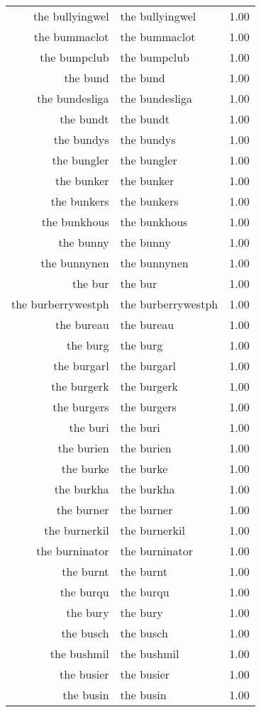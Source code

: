 \begin{table}[ht]
\begin{tabular}{rlr}
  the bullyingwel & the bullyingwel & 1.00 \\ 
  the bummaclot & the bummaclot & 1.00 \\ 
  the bumpclub & the bumpclub & 1.00 \\ 
  the bund & the bund & 1.00 \\ 
  the bundesliga & the bundesliga & 1.00 \\ 
  the bundt & the bundt & 1.00 \\ 
  the bundys & the bundys & 1.00 \\ 
  the bungler & the bungler & 1.00 \\ 
  the bunker & the bunker & 1.00 \\ 
  the bunkers & the bunkers & 1.00 \\ 
  the bunkhous & the bunkhous & 1.00 \\ 
  the bunny & the bunny & 1.00 \\ 
  the bunnynen & the bunnynen & 1.00 \\ 
  the bur & the bur & 1.00 \\ 
  the burberrywestph & the burberrywestph & 1.00 \\ 
  the bureau & the bureau & 1.00 \\ 
  the burg & the burg & 1.00 \\ 
  the burgarl & the burgarl & 1.00 \\ 
  the burgerk & the burgerk & 1.00 \\ 
  the burgers & the burgers & 1.00 \\ 
  the buri & the buri & 1.00 \\ 
  the burien & the burien & 1.00 \\ 
  the burke & the burke & 1.00 \\ 
  the burkha & the burkha & 1.00 \\ 
  the burner & the burner & 1.00 \\ 
  the burnerkil & the burnerkil & 1.00 \\ 
  the burninator & the burninator & 1.00 \\ 
  the burnt & the burnt & 1.00 \\ 
  the burqu & the burqu & 1.00 \\ 
  the bury & the bury & 1.00 \\ 
  the busch & the busch & 1.00 \\ 
  the bushmil & the bushmil & 1.00 \\ 
  the busier & the busier & 1.00 \\ 
  the busin & the busin & 1.00 \\ 

\end{tabular}
\end{table}
